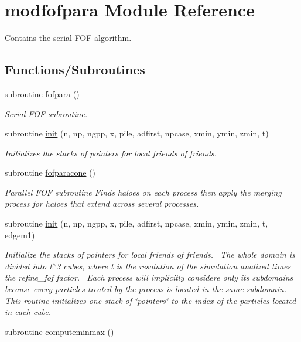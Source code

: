\hypertarget{namespacemodfofpara}{}\section{modfofpara Module Reference}
\label{namespacemodfofpara}


Contains the serial F\+OF algorithm.  


\subsection*{Functions/\+Subroutines}
\begin{DoxyCompactItemize}
\item 
subroutine \hyperlink{namespacemodfofpara_a0e76e564f41683dc0c0104fc789718b0}{fofpara} ()
\begin{DoxyCompactList}\small\item\em Serial F\+OF subroutine. \end{DoxyCompactList}\item 
subroutine \hyperlink{namespacemodfofpara_a5294ecab752fb3cfbea3bec7cd28a29a}{init} (n, np, ngpp, x, pile, adfirst, npcase, xmin, ymin, zmin, t)
\begin{DoxyCompactList}\small\item\em Initializes the stacks of pointers for local friends of friends. \end{DoxyCompactList}\item 
subroutine \hyperlink{namespacemodfofpara_a033a2820dd29f107782b566ca298bde4}{fofparacone} ()
\begin{DoxyCompactList}\small\item\em Parallel F\+OF subroutine Finds haloes on each process then apply the merging process for haloes that extend across several processes. \end{DoxyCompactList}\item 
subroutine \hyperlink{namespacemodfofpara_afdd2abc340cad047a13ebbb62f1bafdc}{init} (n, np, ngpp, x, pile, adfirst, npcase, xmin, ymin, zmin, t, edgem1)
\begin{DoxyCompactList}\small\item\em Initialize the stacks of pointers for local friends of friends.~\newline
 The whole domain is divided into t$^\wedge$3 cubes, where t is the resolution of the simulation analized times the refine\+\_\+fof factor.~\newline
 Each process will implicitly considere only its subdomains because every particles treated by the process is located in the same subdomain.~\newline
 This routine initializes one stack of \char`\"{}pointers\char`\"{} to the index of the particles located in each cube. \end{DoxyCompactList}\item 
subroutine \hyperlink{namespacemodfofpara_aae8bee067b5066b64d8799e78efa239c}{computeminmax} ()
\end{DoxyCompactItemize}


